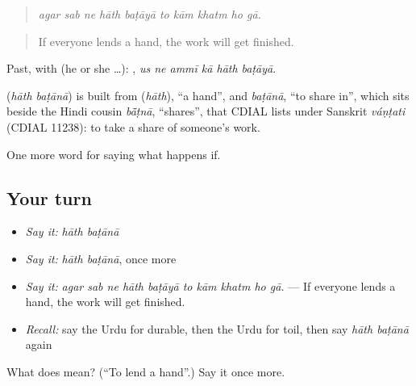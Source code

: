 \begin{quote}
         
\end{quote}

\begin{quote}
\emph{agar sab ne hāth baṭāyā to kām khatm ho gā.}
\end{quote}

\begin{quote}
If everyone lends a hand, the work will get finished.
\end{quote}

Past, with  (he or she …):      , \emph{us ne ammī kā hāth baṭāyā}.

\begin{cousinweb}
\textbf{ } (\emph{hāth baṭānā}) is built from \textbf{} (\emph{hāth}), \textquotedblleft{}a hand\textquotedblright{}, and \emph{baṭānā}, \textquotedblleft{}to share in\textquotedblright{}, which sits beside the Hindi cousin \emph{bā̃ṭnā}, \textquotedblleft{}shares\textquotedblright{}, that CDIAL lists under Sanskrit \emph{váṇṭati} (CDIAL 11238): to take a share of someone's work.
\end{cousinweb}

\begin{grammarlens}[title={What you've built}]
One more word for saying what happens if.
\end{grammarlens}

\subsection*{Your turn}
\begin{itemize}
\raggedright
  \item \emph{Say it:} \emph{hāth baṭānā}
  \item \emph{Say it:} \emph{hāth baṭānā}, once more
  \item \emph{Say it:} \emph{agar sab ne hāth baṭāyā to kām khatm ho gā.} — If everyone lends a hand, the work will get finished.
  \item \emph{Recall:} say the Urdu for durable, then the Urdu for toil, then say \emph{hāth baṭānā} again
\end{itemize}

\begin{tcolorbox}[breakable,colback=teal!4,colframe=teal!35!black,title={Before you move on}]
What does   mean? (\textquotedblleft{}To lend a hand\textquotedblright{}.) Say it once more.
\end{tcolorbox}
